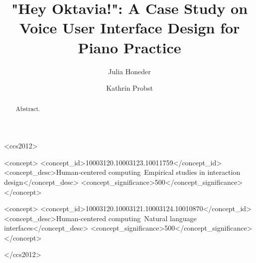 \documentclass[manuscript,review]{acmart}
\begin{document}
\title{"Hey Oktavia!": A Case Study on Voice User Interface Design for Piano Practice}

\author{Julia Honeder}
\author{Kathrin Probst}





\begin{abstract}
Abstract.
\end{abstract}


\begin{CCSXML}
<ccs2012>

<concept>
<concept_id>10003120.10003123.10011759</concept_id>
<concept_desc>Human-centered computing~Empirical studies in interaction design</concept_desc>
<concept_significance>500</concept_significance>
</concept>

<concept>
<concept_id>10003120.10003121.10003124.10010870</concept_id>
<concept_desc>Human-centered computing~Natural language interfaces</concept_desc>
<concept_significance>500</concept_significance>
</concept>

</ccs2012>
\end{CCSXML}



\end{document}
